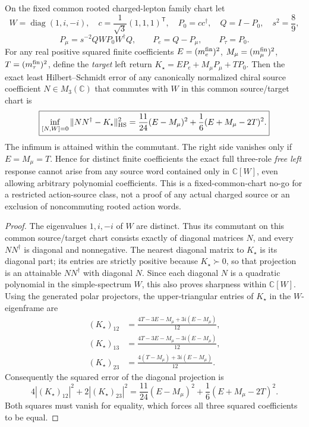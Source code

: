 \documentclass[12pt,a4paper]{article}
\begin{document}
\begin{proposition}
\label{p5:prop:v3217-hopf-commutant-left-return-nogo}
On the fixed common rooted charged-lepton family chart let
\[
 W=\operatorname{diag}(1,i,-i),\quad
 c=\frac1{\sqrt3}(1,1,1)^{\mathsf T},\quad
 P_0=cc^\dagger,\quad Q=I-P_0,\quad s^2=\frac89,
\]
\[
 P_\mu=s^{-2}QWP_0W^\dagger Q,\qquad
 P_e=Q-P_\mu,\qquad P_\tau=P_0.
\]
For any real positive squared finite coefficients
$E=(m_e^{\rm fin})^2$, $M_\mu=(m_\mu^{\rm fin})^2$,
$T=(m_\tau^{\rm fin})^2$, define the \emph{target} left return
$K_\star=EP_e+M_\mu P_\mu+TP_0$.
Then the exact least Hilbert--Schmidt error of any canonically normalized
chiral source coefficient $N\in M_3(\mathbb C)$ that commutes with
$W$ in this common source/target chart is
\[
 \boxed{\inf_{[N,W]=0}\|NN^\dagger-K_\star\|_{\rm HS}^2
  =\frac{11}{24}(E-M_\mu)^2
   +\frac16(E+M_\mu-2T)^2.}
\]
The infimum is attained within the commutant. The right side
vanishes only if $E=M_\mu=T$. Hence for distinct finite
coefficients the exact full three-role \emph{free left} response
cannot arise from any source word contained only in
$\mathbb C[W]$, even allowing arbitrary polynomial coefficients.
This is a fixed-common-chart no-go for a restricted action-source
class, not a proof of any actual charged source or an exclusion of
noncommuting rooted action words.
\end{proposition}
\begin{proof}
The eigenvalues $1,i,-i$ of $W$ are distinct. Thus its commutant
on this common source/target chart consists exactly of diagonal
matrices $N$, and every $NN^\dagger$ is diagonal and nonnegative.
The nearest diagonal matrix to $K_\star$ is its diagonal part;
its entries are strictly positive because $K_\star\succ0$,
so that projection is an attainable $NN^\dagger$ with diagonal
$N$. Since each diagonal $N$ is a quadratic polynomial in the
simple-spectrum $W$, this also proves sharpness within $\mathbb C[W]$.
Using the generated polar projectors, the upper-triangular entries
of $K_\star$ in the $W$-eigenframe are
\[
 \begin{split}
 (K_\star)_{12}&=\frac{4T-3E-M_\mu+3i(E-M_\mu)}{12},\\
 (K_\star)_{13}&=\frac{4T-3E-M_\mu-3i(E-M_\mu)}{12},\\
 (K_\star)_{23}&=\frac{4(T-M_\mu)+3i(E-M_\mu)}{12}.
 \end{split}
\]
Consequently the squared error of the diagonal projection is
\[
 4|(K_\star)_{12}|^2+2|(K_\star)_{23}|^2
 =\frac{11}{24}(E-M_\mu)^2
  +\frac16(E+M_\mu-2T)^2.
\]
Both squares must vanish for equality, which forces all three
squared coefficients to be equal.
\end{proof}
\end{document}
